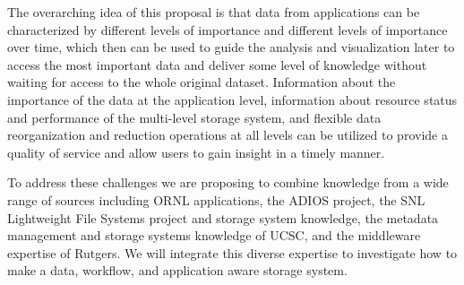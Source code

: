 The overarching idea of this proposal is that data from applications can be characterized by different
levels of importance and different levels of importance over time, which then can be used to guide the analysis and visualization later to access the most important data and deliver some level of knowledge without waiting for access to the whole original dataset. Information about the importance of the data at the application level, information about resource status and performance of the multi-level storage system, and flexible data reorganization and reduction operations at all levels can be utilized to provide a quality of service and allow users to gain insight in a timely manner.


To address these challenges we are proposing to combine knowledge
from a wide range of sources including ORNL applications, the ADIOS project,
the SNL Lightweight File Systems project and storage system knowledge, the metadata
management and storage systems knowledge of UCSC, and the middleware expertise
of Rutgers. We will integrate this diverse expertise to investigate how to make
a data, workflow, and application aware storage system.




